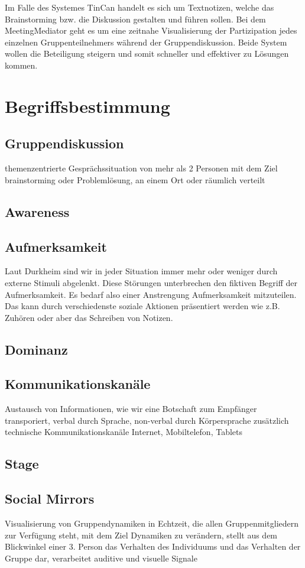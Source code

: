 \documentclass{seminarvorlage}
\begin{document}
Im Falle des Systemes TinCan
handelt es sich um Textnotizen, welche das Brainstorming bzw. die Diskussion
gestalten und führen sollen. 
Bei dem MeetingMediator geht es um eine zeitnahe
Visualisierung der Partizipation jedes einzelnen Gruppenteilnehmers während der
Gruppendiskussion. Beide System wollen die Beteiligung steigern und somit
schneller und effektiver zu Lösungen kommen.

\section{Begriffsbestimmung}
\subsection{Gruppendiskussion}
themenzentrierte Gesprächssituation von mehr als 2 Personen mit dem Ziel
brainstorming oder Problemlösung, an einem Ort oder räumlich verteilt
\subsection{Awareness}

\subsection{Aufmerksamkeit}
Laut Durkheim sind wir in jeder Situation immer mehr oder weniger durch externe
Stimuli abgelenkt. Diese Störungen unterbrechen den fiktiven Begriff der
Aufmerksamkeit. Es bedarf also einer Anstrengung Aufmerksamkeit mitzuteilen. Das
kann durch verschiedenste soziale Aktionen präsentiert werden wie z.B. Zuhören
oder aber das Schreiben von Notizen.

\subsection{Dominanz}

\subsection{Kommunikationskanäle}
Austausch von Informationen, wie wir eine Botschaft zum Empfänger transporiert,
verbal durch Sprache, non-verbal durch Körpersprache
zusätzlich technische Kommunikationskanäle Internet, Mobiltelefon, Tablets
\subsection{Stage}

\subsection{Social Mirrors}
Visualisierung von Gruppendynamiken in Echtzeit, die allen Gruppenmitgliedern
zur Verfügung steht, mit dem Ziel Dynamiken zu verändern, stellt aus dem
Blickwinkel einer 3. Person das Verhalten des Individuums und das Verhalten der
Gruppe dar, verarbeitet auditive und visuelle Signale
\end{document}
